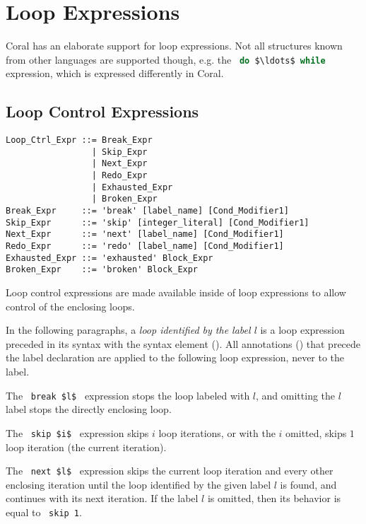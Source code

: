 \section{Loop Expressions}

Coral has an elaborate support for loop expressions. Not all structures known from other languages are supported though, e.g. the ~\lstinline[language=Java]!do $\ldots$ while!~ expression, which is expressed differently in Coral. 






\subsection{Loop Control Expressions}
\label{sec:loop-control-expressions}

\syntax\begin{lstlisting}
Loop_Ctrl_Expr ::= Break_Expr
                 | Skip_Expr
                 | Next_Expr
                 | Redo_Expr
                 | Exhausted_Expr
                 | Broken_Expr
Break_Expr     ::= 'break' [label_name] [Cond_Modifier1]
Skip_Expr      ::= 'skip' [integer_literal] [Cond_Modifier1]
Next_Expr      ::= 'next' [label_name] [Cond_Modifier1]
Redo_Expr      ::= 'redo' [label_name] [Cond_Modifier1]
Exhausted_Expr ::= 'exhausted' Block_Expr
Broken_Expr    ::= 'broken' Block_Expr
\end{lstlisting}

Loop control expressions are made available inside of loop expressions to allow control of the enclosing loops.

In the following paragraphs, a {\em loop identified by the label $l$} is a loop expression preceded in its syntax with the syntax element  (). All annotations () that precede the label declaration are applied to the following loop expression, never to the label. 

The ~\lstinline!break $l$!~ expression stops the loop labeled with $l$, and omitting the $l$ label stops the directly enclosing loop. 

The ~\lstinline!skip $i$!~ expression skips $i$ loop iterations, or with the $i$ omitted, skips $1$ loop iteration (the current iteration). 

The ~\lstinline!next $l$!~ expression skips the current loop iteration and every other enclosing iteration until the loop identified by the given label $l$ is found, and continues with its next iteration. If the label $l$ is omitted, then its behavior is equal to ~\lstinline!skip 1!. 

